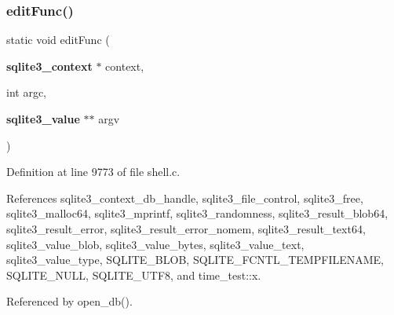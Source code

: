 \subsubsection{edit\+Func()}
{\footnotesize\ttfamily static void edit\+Func (\begin{DoxyParamCaption}\item[{\textbf{ sqlite3\+\_\+context} $\ast$}]{context,  }\item[{int}]{argc,  }\item[{\textbf{ sqlite3\+\_\+value} $\ast$$\ast$}]{argv }\end{DoxyParamCaption})\hspace{0.3cm}{\ttfamily [static]}}



Definition at line 9773 of file shell.\+c.



References sqlite3\+\_\+context\+\_\+db\+\_\+handle, sqlite3\+\_\+file\+\_\+control, sqlite3\+\_\+free, sqlite3\+\_\+malloc64, sqlite3\+\_\+mprintf, sqlite3\+\_\+randomness, sqlite3\+\_\+result\+\_\+blob64, sqlite3\+\_\+result\+\_\+error, sqlite3\+\_\+result\+\_\+error\+\_\+nomem, sqlite3\+\_\+result\+\_\+text64, sqlite3\+\_\+value\+\_\+blob, sqlite3\+\_\+value\+\_\+bytes, sqlite3\+\_\+value\+\_\+text, sqlite3\+\_\+value\+\_\+type, S\+Q\+L\+I\+T\+E\+\_\+\+B\+L\+OB, S\+Q\+L\+I\+T\+E\+\_\+\+F\+C\+N\+T\+L\+\_\+\+T\+E\+M\+P\+F\+I\+L\+E\+N\+A\+ME, S\+Q\+L\+I\+T\+E\+\_\+\+N\+U\+LL, S\+Q\+L\+I\+T\+E\+\_\+\+U\+T\+F8, and time\+\_\+test\+::x.



Referenced by open\+\_\+db().


